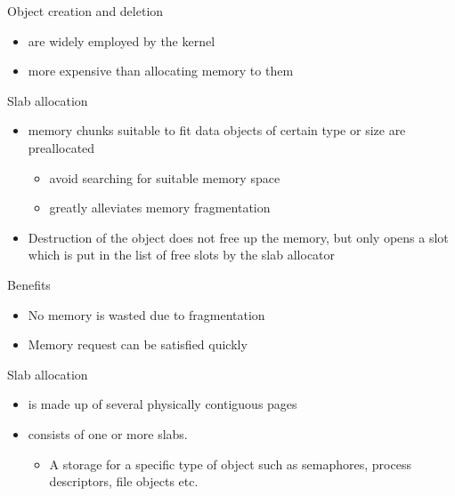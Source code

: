 \begin{frame}
  \begin{exampleblock}{Object creation and deletion}
    \begin{itemize}
    \item are widely employed by the kernel
    \item more expensive than allocating memory to them
    \end{itemize}
  \end{exampleblock}
  \begin{exampleblock}{Slab allocation}
    \begin{itemize}
    \item memory chunks suitable to fit data objects of certain type or size are
      preallocated
      \begin{itemize}
      \item avoid searching for suitable memory space
      \item greatly alleviates memory fragmentation
      \end{itemize}
    \item Destruction of the object does not free up the memory, but only opens a slot
      which is put in the list of free slots by the slab allocator
    \end{itemize}
  \end{exampleblock}
  \begin{exampleblock}{Benefits}
    \begin{itemize}
    \item No memory is wasted due to fragmentation
    \item Memory request can be satisfied quickly
    \end{itemize}
  \end{exampleblock}
\end{frame}

\begin{frame}
  \begin{exampleblock}{Slab allocation}
    \begin{itemize}
    \item[Slab] is made up of several physically contiguous pages
    \item[Cache] consists of one or more slabs.
      \begin{itemize}
      \item A storage for a specific type of object such as semaphores, process
        descriptors, file objects etc.
      \end{itemize}
    \end{itemize}
  \end{exampleblock}
  \begin{center}
     
  \end{center}
\end{frame}

